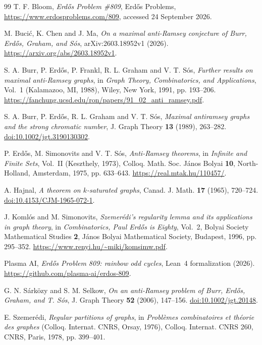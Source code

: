 \documentclass[10pt]{article}
\theoremstyle{remark}
\begin{document}
\begin{thebibliography}{99}
T. F. Bloom, \emph{Erd\H{o}s Problem \#809}, Erd\H{o}s Problems, \url{https://www.erdosproblems.com/809}, accessed 24 September 2026.

M. Buci\'{c}, K. Chen and J. Ma, \emph{On a maximal anti-Ramsey conjecture of Burr, Erd\H{o}s, Graham, and S\'{o}s}, arXiv:2603.18952v1 (2026). \url{https://arxiv.org/abs/2603.18952v1}.

S. A. Burr, P. Erd\H{o}s, P. Frankl, R. L. Graham and V. T. S\'{o}s, \emph{Further results on maximal anti-Ramsey graphs}, in \emph{Graph Theory, Combinatorics, and Applications}, Vol.~1 (Kalamazoo, MI, 1988), Wiley, New York, 1991, pp. 193--206. \url{https://fanchung.ucsd.edu/ron/papers/91_02_anti_ramsey.pdf}.

S. A. Burr, P. Erd\H{o}s, R. L. Graham and V. T. S\'{o}s, \emph{Maximal antiramsey graphs and the strong chromatic number}, J. Graph Theory \textbf{13} (1989), 263--282. \href{https://doi.org/10.1002/jgt.3190130302}{doi:10.1002/jgt.3190130302}.

P. Erd\H{o}s, M. Simonovits and V. T. S\'{o}s, \emph{Anti-Ramsey theorems}, in \emph{Infinite and Finite Sets}, Vol.~II (Keszthely, 1973), Colloq. Math. Soc. J\'{a}nos Bolyai \textbf{10}, North-Holland, Amsterdam, 1975, pp. 633--643. \url{https://real.mtak.hu/110457/}.

A. Hajnal, \emph{A theorem on $k$-saturated graphs}, Canad. J. Math. \textbf{17} (1965), 720--724. \href{https://doi.org/10.4153/CJM-1965-072-1}{doi:10.4153/CJM-1965-072-1}.

J. Koml\'{o}s and M. Simonovits, \emph{Szemer\'{e}di's regularity lemma and its applications in graph theory}, in \emph{Combinatorics, Paul Erd\H{o}s is Eighty}, Vol.~2, Bolyai Society Mathematical Studies \textbf{2}, J\'{a}nos Bolyai Mathematical Society, Budapest, 1996, pp. 295--352. \url{https://www.renyi.hu/~miki/komsimw.pdf}.

Plasma AI, \emph{Erd\H{o}s Problem 809: rainbow odd cycles}, Lean~4 formalization (2026). \url{https://github.com/plasma-ai/erdos-809}.

G. N. S\'{a}rk\"{o}zy and S. M. Selkow, \emph{On an anti-Ramsey problem of Burr, Erd\H{o}s, Graham, and T. S\'{o}s}, J. Graph Theory \textbf{52} (2006), 147--156. \href{https://doi.org/10.1002/jgt.20148}{doi:10.1002/jgt.20148}.

E. Szemer\'{e}di, \emph{Regular partitions of graphs}, in \emph{Probl\`emes combinatoires et th\'{e}orie des graphes} (Colloq. Internat. CNRS, Orsay, 1976), Colloq. Internat. CNRS 260, CNRS, Paris, 1978, pp. 399--401.

\end{thebibliography}
\end{document}
